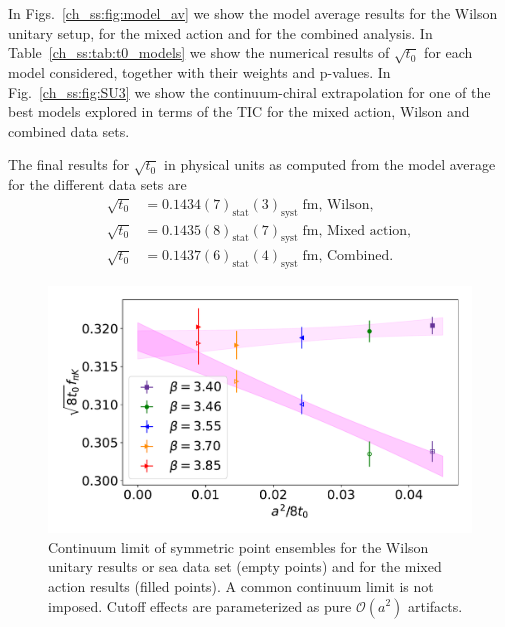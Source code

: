 In Figs.~\ref{ch_ss:fig:model_av} we show the model average results for the Wilson unitary setup, for the mixed action and for the combined analysis. In Table~\ref{ch_ss:tab:t0_models} we show the numerical results of $\sqrt{t_0}$ for each model considered, together with their weights and p-values. In Fig.~\ref{ch_ss:fig:SU3} we show the continuum-chiral extrapolation for one of the best models explored in terms of the TIC for the mixed action, Wilson and combined data sets.

The final results for $\sqrt{t_0}$ in physical units as computed from the model average for the different data sets are
\begin{align}
\sqrt{t_0}&=0.1434(7)_{\textrm{stat}}(3)_{\textrm{syst}}\;\textrm{fm, Wilson}, \\
\sqrt{t_0}&=0.1435(8)_{\textrm{stat}}(7)_{\textrm{syst}}\;\textrm{fm, Mixed action}, \\
\sqrt{t_0}&=0.1437(6)_{\textrm{stat}}(4)_{\textrm{syst}}\;\textrm{fm, Combined}.
\end{align}

\begin{figure}
    \centering
    \includegraphics[width=1.\textwidth]{./cap5/figs/continuum_sym.pdf}
    \caption{Continuum limit of symmetric point ensembles for the Wilson unitary results or sea data set (empty points) and for the mixed action results (filled points). A common continuum limit is not imposed. Cutoff effects are parameterized as pure $\mathcal{O}(a^2)$ artifacts.}
    \label{ch_ss:fig:universality}
\end{figure}

